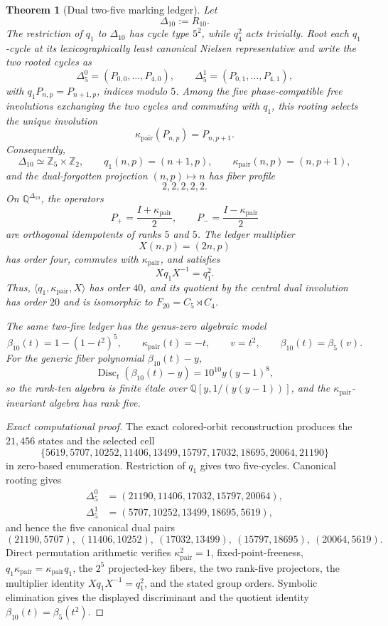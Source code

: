 \documentclass[11pt]{article}
\newtheorem{theorem}{Theorem}[section]
\theoremstyle{remark}
\newcommand{\Q}{\mathbb Q}
\begin{document}
\begin{theorem}[Dual two-five marking ledger]\label{thm:dual-two-five-ledger}
Let
\[
 \Delta_{10}:=R_{10}.
\]
The restriction of $q_1$ to $\Delta_{10}$ has cycle type $5^2$, while $q_4^2$ acts trivially.  Root each $q_1$-cycle at its lexicographically least canonical Nielsen representative and write the two rooted cycles as
\[
 \Delta_5^0=(P_{0,0},\ldots,P_{4,0}),
 \qquad
 \Delta_5^1=(P_{0,1},\ldots,P_{4,1}),
\]
with $q_1P_{n,p}=P_{n+1,p}$, indices modulo $5$.  Among the five phase-compatible free involutions exchanging the two cycles and commuting with $q_1$, this rooting selects the unique involution
\[
 \boxed{\kappa_{\mathrm{pair}}(P_{n,p})=P_{n,p+1}.}
\]
Consequently,
\[
 \boxed{
 \Delta_{10}\simeq\mathbb Z_5\times\mathbb Z_2,
 \qquad
 q_1(n,p)=(n+1,p),
 \qquad
 \kappa_{\mathrm{pair}}(n,p)=(n,p+1),
 }
\]
and the dual-forgotten projection $(n,p)\mapsto n$ has fiber profile
\[
 \boxed{2,2,2,2,2.}
\]
On $\Q^{\Delta_{10}}$, the operators
\[
 P_+=\frac{I+\kappa_{\mathrm{pair}}}{2},
 \qquad
 P_-=\frac{I-\kappa_{\mathrm{pair}}}{2}
\]
are orthogonal idempotents of ranks $5$ and $5$.  The ledger multiplier
\[
 X(n,p)=(2n,p)
\]
has order four, commutes with $\kappa_{\mathrm{pair}}$, and satisfies
\[
 Xq_1X^{-1}=q_1^2.
\]
Thus, $\langle q_1,\kappa_{\mathrm{pair}},X\rangle$ has order $40$, and its quotient by the central dual involution has order $20$ and is isomorphic to $F_{20}=C_5\rtimes C_4$.

The same two-five ledger has the genus-zero algebraic model
\[
 \boxed{
 \beta_{10}(t)=1-(1-t^2)^5,
 \qquad
 \kappa_{\mathrm{pair}}(t)=-t,
 \qquad
 v=t^2,
 \qquad
 \beta_{10}(t)=\beta_5(v).
 }
\]
For the generic fiber polynomial $\beta_{10}(t)-y$,
\[
 \operatorname{Disc}_t(\beta_{10}(t)-y)=10^{10}y(y-1)^8,
\]
so the rank-ten algebra is finite \'etale over $\Q[y,1/(y(y-1))]$, and the $\kappa_{\mathrm{pair}}$-invariant algebra has rank five.
\end{theorem}

\begin{proof}[Exact computational proof]
The exact colored-orbit reconstruction produces the $21{,}456$ states and the selected cell
\[
 \{5619,5707,10252,11406,13499,15797,17032,18695,20064,21190\}
\]
in zero-based enumeration.  Restriction of $q_1$ gives two five-cycles.  Canonical rooting gives
\[
\begin{aligned}
 \Delta_5^0&=(21190,11406,17032,15797,20064),\\
 \Delta_5^1&=(5707,10252,13499,18695,5619),
\end{aligned}
\]
and hence the five canonical dual pairs
\[
 (21190,5707),\ (11406,10252),\ (17032,13499),\
 (15797,18695),\ (20064,5619).
\]
Direct permutation arithmetic verifies $\kappa_{\mathrm{pair}}^2=1$, fixed-point-freeness, $q_1\kappa_{\mathrm{pair}}=\kappa_{\mathrm{pair}} q_1$, the $2^5$ projected-key fibers, the two rank-five projectors, the multiplier identity $Xq_1X^{-1}=q_1^2$, and the stated group orders.  Symbolic elimination gives the displayed discriminant and the quotient identity $\beta_{10}(t)=\beta_5(t^2)$.
\end{proof}
\end{document}
